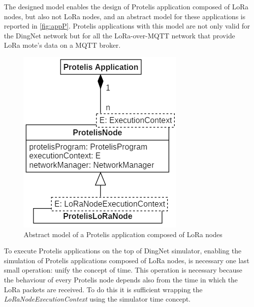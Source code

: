 % 
The designed model enables the design of Protelis application composed of LoRa nodes, but also not LoRa nodes, and an abstract model for these applications is reported in \autoref{fig:appP}. Protelis applications with this model are not only valid for the DingNet network but for all the LoRa-over-MQTT network that provide LoRa mote's data on a MQTT broker.
% 
\begin{figure}[H]
    \centering
    \includegraphics{figures/app.png}
    \caption{Abstract model of a Protelis application composed of LoRa nodes}
    \label{fig:appP}
\end{figure}
% 
\noindent To execute Protelis applications on the top of DingNet simulator, enabling the simulation of Protelis applications composed of LoRa nodes, is necessary one last small operation: unify the concept of time. 
This operation is necessary because the behaviour of every Protelis node depends also from the time in which the LoRa packets are received.
To do this it is sufficient wrapping the \mbox{\textit{LoRaNodeExecutionContext}} using the simulator time concept.


